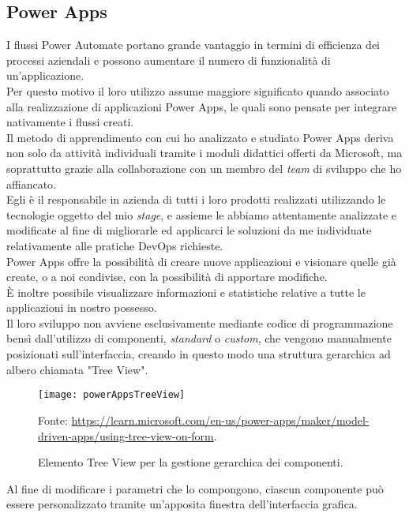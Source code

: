 \subsection{Power Apps}
I flussi Power Automate portano grande vantaggio in termini di efficienza dei processi aziendali e possono aumentare il numero di funzionalità di un'applicazione.\\
Per questo motivo il loro utilizzo assume maggiore significato quando associato alla realizzazione di applicazioni Power Apps, le quali sono pensate per integrare nativamente i flussi creati.\\
Il metodo di apprendimento con cui ho analizzato e studiato Power Apps deriva non solo da attività individuali tramite i moduli didattici offerti da Microsoft, ma soprattutto grazie alla collaborazione con un membro del \emph{team} di sviluppo che ho affiancato.\\
Egli è il responsabile in azienda di tutti i loro prodotti realizzati utilizzando le tecnologie oggetto del mio \emph{stage}, e assieme le abbiamo attentamente analizzate e modificate al fine di migliorarle ed applicarci le soluzioni da me individuate relativamente alle pratiche \gls{DevOps} richieste.\\
Power Apps offre la possibilità di creare nuove applicazioni e visionare quelle già create, o a noi condivise, con la possibilità di apportare modifiche.\\
È inoltre possibile visualizzare informazioni e statistiche relative a tutte le applicazioni in nostro possesso.\\
Il loro sviluppo non avviene esclusivamente mediante codice di programmazione bensì dall'utilizzo di componenti, \emph{standard} o \emph{custom}, che vengono manualmente posizionati sull'interfaccia, creando in questo modo una struttura gerarchica ad albero chiamata "Tree View".
\begin{figure}[htbp] 
    \centering 
    \texttt{[image: powerAppsTreeView]} 
    \caption{Elemento Tree View per la gestione gerarchica dei componenti.}
    \label{fig:powerAppsTreeView}
    \vspace{1mm}
    Fonte: \url{https://learn.microsoft.com/en-us/power-apps/maker/model-driven-apps/using-tree-view-on-form}.
\end{figure}
\newline \noindent Al fine di modificare i parametri che lo compongono, ciascun componente può essere personalizzato tramite un'apposita finestra dell'interfaccia grafica.\\
